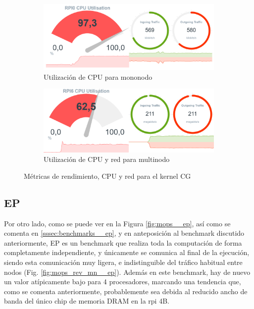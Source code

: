 \begin{figure}[h!]
    \begin{subfigure}[c]{0.9\textwidth}
        \includegraphics[width=\textwidth]{img/benchmark_rev/cg_rev_sn.png}
        \caption{Utilización de CPU para mononodo}
        \label{fig:mops_rev_sn__cg}
    \end{subfigure}

    \vspace{0.5cm}
    
    \begin{subfigure}[c]{0.9\textwidth}
        \includegraphics[width=\textwidth]{img/benchmark_rev/cg_rev_mn.png}
        \caption{Utilización de CPU y red para multinodo}
        \label{fig:mops_rev_mn__cg}
    \end{subfigure}
    \caption{Métricas de rendimiento, CPU y red para el kernel CG}
    \label{fig:mops__cg}
\end{figure}

\subsection{EP}
\label{ssec:comparacion_resultados__ep}
Por otro lado, como se puede ver en la Figura \ref{fig:mops__ep}, así como se comenta en \ref{sssec:benchmarks__ep}, y en anteposición al benchmark discutido anteriormente, EP es un benchmark que realiza toda la computación de forma completamente independiente, y únicamente se comunica al final de la ejecución, siendo esta comunicación muy ligera, e indistinguible del tráfico habitual entre nodos (Fig. \ref{fig:mops_rev_mn__ep}). Además en este benchmark, hay de nuevo un valor atípicamente bajo para 4 procesadores, marcando una tendencia que, como se comenta anteriormente, probablemente sea debida al reducido ancho de banda del único chip de memoria DRAM en la \acrlong{rpi} 4B.

